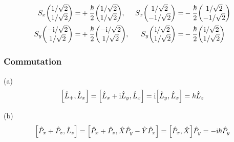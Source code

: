 \begin{align*}
    S_x \mqty(1 / \sqrt{2} \\ 1 / \sqrt{2}) = & + \frac{\hbar}{2} \mqty(1 / \sqrt{2} \\ 1 / \sqrt{2}), & S_x \mqty(1 / \sqrt{2} \\ - 1 / \sqrt{2}) = & - \frac{\hbar}{2} \mqty(1 / \sqrt{2} \\ - 1 / \sqrt{2})\\
    S_y \mqty(- \rmi / \sqrt{2} \\ 1 / \sqrt{2}) = & + \frac{\hbar}{2} \mqty(- \rmi / \sqrt{2} \\ 1 / \sqrt{2}), & S_y \mqty(\rmi / \sqrt{2} \\ 1 / \sqrt{2}) = & - \frac{\hbar}{2} \mqty(\rmi / \sqrt{2} \\ 1 / \sqrt{2})
\end{align*}

\subsubsection{Commutation}

(a)
\[
    \qty[\hat{L}_+, \hat{L}_x] = \qty[\hat{L}_x + \mathrm{i} \hat{L}_y, \hat{L}_x] = \mathrm{i} \qty[\hat{L}_y, \hat{L}_x] = \hbar \hat{L}_z
\]

(b)
\[
    \qty[\hat{P}_x + \hat{P}_z, \hat{L}_z] = \qty[\hat{P}_x + \hat{P}_z, \hat{X} \hat{P}_y - \hat{Y} \hat{P}_x] = \qty[\hat{P}_x, \hat{X}] \hat{P}_y = - \mathrm{i} \hbar \hat{P}_y
\]